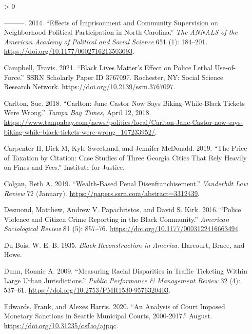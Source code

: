 \documentclass[
  12pt,
]{article}
\newlength{\cslhangindent}
\newenvironment{CSLReferences}[2] %
 {%
  \setlength{\parindent}{0pt}
  \ifodd #1 \everypar{\setlength{\hangindent}{\cslhangindent}}\ignorespaces\fi
  \ifnum #2 > 0
  \setlength{\parskip}{#2\baselineskip}
  \fi
 }%
 {}
\begin{document}
\begin{CSLReferences}{1}{0}
\leavevmode\hypertarget{ref-Burch2014}{}%
---------. 2014. {``Effects of {Imprisonment} and {Community Supervision} on {Neighborhood Political Participation} in {North Carolina}.''} \emph{The ANNALS of the American Academy of Political and Social Science} 651 (1): 184--201. \url{https://doi.org/10.1177/0002716213503093}.

\leavevmode\hypertarget{ref-Campbell2021}{}%
Campbell, Travis. 2021. {``Black {Lives Matter}'s {Effect} on {Police Lethal Use}-of-{Force}.''} SSRN Scholarly Paper ID 3767097. {Rochester, NY}: {Social Science Research Network}. \url{https://doi.org/10.2139/ssrn.3767097}.

\leavevmode\hypertarget{ref-Carlton2018}{}%
Carlton, Sue. 2018. {``Carlton: {Jane Castor} Now Says Biking-While-Black Tickets Were Wrong.''} \emph{Tampa Bay Times}, April 12, 2018. \url{https://www.tampabay.com/news/politics/local/Carlton-Jane-Castor-now-says-biking-while-black-tickets-were-wrong_167233952/}.

\leavevmode\hypertarget{ref-CarpenterII2019}{}%
Carpenter II, Dick M, Kyle Sweetland, and Jennifer McDonald. 2019. {``The {Price} of {Taxation} by {Citation}: {Case Studies} of {Three Georgia Cities That Rely Heavily} on {Fines} and {Fees}.''} {Institute for Justice}.

\leavevmode\hypertarget{ref-Colgan2019}{}%
Colgan, Beth A. 2019. {``Wealth-{Based Penal Disenfranchisement}.''} \emph{Vanderbilt Law Review} 72 (January). \url{https://papers.ssrn.com/abstract=3312439}.

\leavevmode\hypertarget{ref-Desmond2016}{}%
Desmond, Matthew, Andrew V. Papachristos, and David S. Kirk. 2016. {``Police {Violence} and {Citizen Crime Reporting} in the {Black Community}.''} \emph{American Sociological Review} 81 (5): 857--76. \url{https://doi.org/10.1177/0003122416663494}.

\leavevmode\hypertarget{ref-DuBois1935}{}%
Du Bois, W. E. B. 1935. \emph{Black {Reconstruction} in {America}}. {Harcourt, Brace, and Howe}.

\leavevmode\hypertarget{ref-Dunn2009}{}%
Dunn, Ronnie A. 2009. {``Measuring {Racial Disparities} in {Traffic Ticketing Within Large Urban Jurisdictions}.''} \emph{Public Performance \& Management Review} 32 (4): 537--61. \url{https://doi.org/10.2753/PMR1530-9576320403}.

\leavevmode\hypertarget{ref-Edwards2020}{}%
Edwards, Frank, and Alexes Harris. 2020. {``An {Analysis} of {Court Imposed Monetary Sanctions} in {Seattle Municipal Courts}, 2000-2017.''} August. \url{https://doi.org/10.31235/osf.io/ajpqc}.


\end{CSLReferences}
\end{document}
